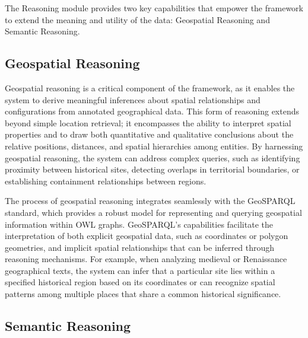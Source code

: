 The Reasoning module provides two key capabilities that empower the framework to extend the meaning and utility of the data: Geospatial Reasoning and Semantic Reasoning.

\subsection{Geospatial Reasoning}\label{VI-subsec:geospatialReasoning}

Geospatial reasoning is a critical component of the framework, as it enables the system to derive meaningful inferences about spatial relationships and configurations from annotated geographical data. This form of reasoning extends beyond simple location retrieval; it encompasses the ability to interpret spatial properties and to draw both quantitative and qualitative conclusions about the relative positions, distances, and spatial hierarchies among entities. By harnessing geospatial reasoning, the system can address complex queries, such as identifying proximity between historical sites, detecting overlaps in territorial boundaries, or establishing containment relationships between regions.

The process of geospatial reasoning integrates seamlessly with the GeoSPARQL standard, which provides a robust model for representing and querying geospatial information within OWL graphs. GeoSPARQL’s capabilities facilitate the interpretation of both explicit geospatial data, such as coordinates or polygon geometries, and implicit spatial relationships that can be inferred through reasoning mechanisms. For example, when analyzing medieval or Renaissance geographical texts, the system can infer that a particular site lies within a specified historical region based on its coordinates or can recognize spatial patterns among multiple places that share a common historical significance.

\subsection{Semantic Reasoning}\label{VI-subsec:semanticReasoning}

